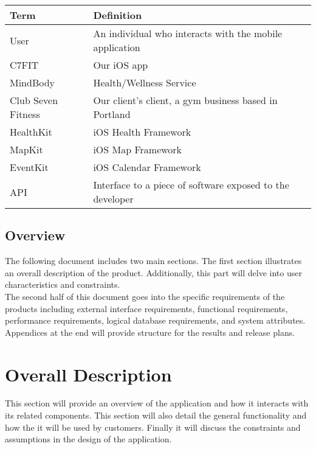 \documentclass[letterpaper,10pt,titlepage]{article}
\begin{document}
\begin{center}
    \begin{tabular}{ | l | l | p{5cm} |}
    \hline
Term               & Definition                                               \\ \hline
User               & An individual who interacts with the mobile application \\ \hline
C7FIT              & Our iOS app                                              \\ \hline
MindBody           & Health/Wellness Service                                  \\ \hline
Club Seven Fitness & Our client's client, a gym business based in Portland    \\ \hline
HealthKit          & iOS Health Framework                                     \\ \hline
MapKit             & iOS Map Framework                                        \\ \hline
EventKit           & iOS Calendar Framework                                   \\ \hline
API                & Interface to a piece of software exposed to the developer \\ \hline
    \end{tabular}
\end{center}

\subsection{Overview}

The following document includes two main sections. The first section illustrates an overall description of the product. Additionally, this part will delve into user characteristics and constraints.\\

The second half of this document goes into the specific requirements of the products including external interface requirements, functional requirements, performance requirements, logical database requirements, and system attributes. Appendices at the end will provide structure for the results and release plans.\\

\section{Overall Description}

This section will provide an overview of the application and how it interacts with its related components. This section will also detail the general functionality and how the it will be used by customers. Finally it will discuss the constraints and assumptions in the design of the application.
\end{document}
